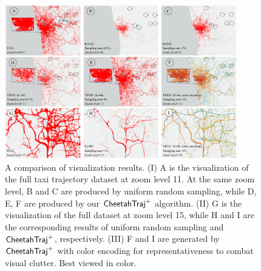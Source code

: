 
\begin{figure}[t]
	\centering
	\includegraphics[width=0.90\textwidth]{pictures/Teaser.pdf}
	\vspace{-2mm}
	\caption{A comparison of visualization results. (I) A is the visualization of the full \pt{} taxi trajectory dataset at zoom level 11.
    At the same zoom level, B and C are produced by uniform random sampling,
    while D, E, F are produced by our $\mathsf{CheetahTraj}^{+}$ algorithm.
    (II) G is the visualization of the full \pt{} dataset at zoom level 15, while H and I are the corresponding results of uniform random sampling and $\mathsf{CheetahTraj}^{+}$, respectively.
    (III) F and I are generated by $\mathsf{CheetahTraj}^{+}$ with color encoding for representativeness to combat visual clutter.
    Best viewed in color.}
	\label{fig:teaser}
\trim \trim
\end{figure}

